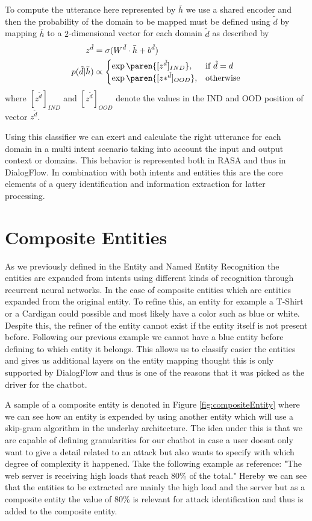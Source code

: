 To compute the utterance here represented by $\bar{h}$ we use a shared encoder and then the probability of the domain to be mapped must be defined using $\tilde{d}$ by mapping $\bar{h}$ to a $2$-dimensional vector for each domain $\tilde{d}$ as described by \cite{formulaDomainClassifier}
\begin{align*}
  z^{\tilde{d}} &= \sigma(W^{\tilde{d}} \cdot \bar{h} + b^{\tilde{d}})\\
  p(\tilde{d} | \bar{h}) &\propto
\begin{cases}
	\exp\paren{[z^{\tilde{d}}]_{IND}},& \text{if } \tilde{d} = d\\
    \exp\paren{[z*^{\tilde{d}}]_{OOD}},& \text{otherwise}
\end{cases}
\end{align*}
 where $[z^{\tilde{d}}]_{IND}$ and $[z^{\tilde{d}}]_{OOD}$ denote the values in the IND and OOD position of vector $z^{\tilde{d}}$.

Using this classifier we can exert and calculate the right utterance for each domain in a multi intent scenario taking into account the input and output context or domains. This behavior is represented both in RASA and thus in DialogFlow. In combination with both intents and entities this are the core elements of a query identification and information extraction for latter processing.

\section{Composite Entities}
As we previously defined in the Entity and Named Entity Recognition the entities are expanded from intents using different kinds of recognition through recurrent neural networks. In the case of composite entities which are entities expanded from the original entity. To refine this, an entity for example a T-Shirt or a Cardigan could possible and most likely have a color such as blue or white. Despite this, the refiner of the entity cannot exist if the entity itself is not present before. Following our previous example we cannot have a blue entity before defining to which entity it belongs. This allows us to classify easier the entities and gives us additional layers on the entity mapping thought this is only supported by DialogFlow and thus is one of the reasons that it was picked as the driver for the chatbot.

A sample of a composite entity is denoted in Figure \ref{fig:compositeEntity} where we can see how an entity is expended by using another entity which will use a skip-gram algorithm in the underlay architecture. The idea under this is that we are capable of defining granularities for our chatbot in case a user doesnt only want to give a detail related to an attack but also wants to specify with which degree of complexity it happened. Take the following example as reference:
\newline
"The web server is receiving high loads that reach 80\% of the total." 
\newline 
Hereby we can see that the entities to be extracted are mainly the high load and the server but as a composite entity the value of 80\% is relevant for attack identification and thus is added to the composite entity.

